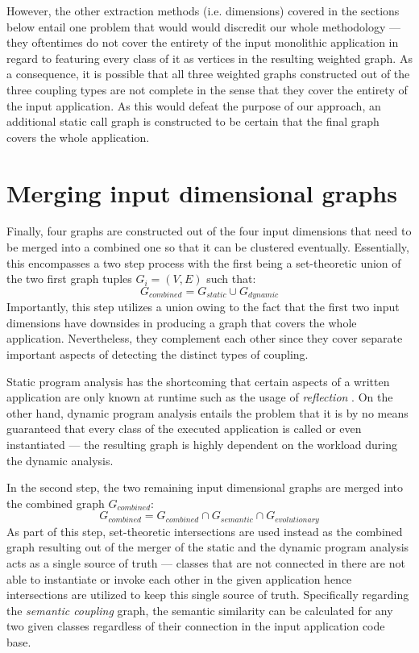 \documentclass[12pt,a4paper]{report}
\begin{document}
However, the other extraction methods (i.e. dimensions) covered in the
sections below entail one problem that would would discredit
our whole methodology --- they oftentimes do not cover the entirety of the
input monolithic application in regard to featuring every class of it
as vertices in the resulting weighted graph.
As a consequence, it is possible that all three weighted graphs constructed
out of the three coupling types are not complete in the sense that they cover
the entirety of the input application. As this would defeat the purpose of
our approach, an additional static call graph is constructed to be certain
that the final graph covers the whole application.



\section{Merging input dimensional graphs} \label{sect:merging-graphs}

Finally, four graphs are constructed out of the four input dimensions
that need to be merged into a combined one so that it can be clustered eventually.
Essentially, this encompasses a two step process with the first being
a set-theoretic union of the two first graph tuples \(G_i = (V, E)\) such that:
\[
  G_{combined} = G_{static} \cup G_{dynamic}
\]
Importantly, this step utilizes a union owing to the fact
that the first two input dimensions have downsides in producing a graph
that covers the whole application.
Nevertheless, they complement each other since they cover separate important
aspects of detecting the distinct types of coupling.

Static program analysis has the shortcoming that certain aspects of a written
application are only known at runtime such as the usage of
\textit{reflection} \cite{landman2017reflection}.
On the other hand, dynamic program analysis entails the problem that
it is by no means guaranteed that every class of the executed application
is called or even instantiated --- the resulting graph is highly dependent
on the workload during the dynamic analysis.

In the second step, the two remaining input dimensional graphs are merged into
the combined graph \(G_{combined}\):
\[
  G_{combined} = G_{combined} \cap G_{semantic} \cap G_{evolutionary}
\]
As part of this step, set-theoretic intersections are used instead as the
combined graph resulting out of the merger of the static and the dynamic
program analysis acts as a single source of truth --- classes that are not
connected in there are not able to instantiate or invoke each other in the
given application hence intersections are utilized to keep this single source
of truth.
Specifically regarding the \textit{semantic coupling} graph, the semantic
similarity can be calculated for any two given classes regardless of their
connection in the input application code base.
\end{document}

